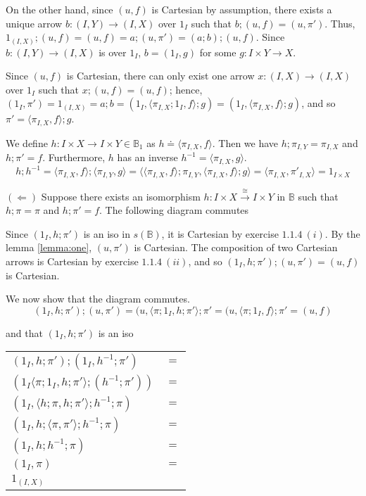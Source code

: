 \documentclass{article}
\begin{document}
On the other hand, since $(u,f)$ is Cartesian by assumption, 
there exists a unique arrow $b : (I,Y) \to (I,X)$ over $1_I$ such that
$b;(u,f) = (u,\pi')$. Thus, $1_{(I,X)};(u,f) = (u,f) = a;(u,\pi') = (a;b);(u,f)$. 
Since $b : (I,Y) \to (I,X)$ is over $1_I$, $b = (1_I, g)$ for some $g : I \times Y \to X$.

Since $(u,f)$ is Cartesian,
there can only exist one arrow $x : (I,X) \to (I,X)$ over $1_I$ such that $x;(u,f) = (u,f)$; hence, 
$(1_I, \pi') = 1_{(I,X)} = a;b = (1_I, \langle \pi_{I,X};1_I , f \rangle; g) = (1_I, \langle \pi_{I,X} , f \rangle; g)$,
and so $\pi' = \langle \pi_{I,X} , f \rangle; g$.

We define $h : I \times X \to I \times Y \in \mathbb B_1$ as $h \doteq \langle \pi_{I,X}, f \rangle$. Then we have $h;\pi_{I,Y} = \pi_{I,X}$ and
$h;\pi' = f$. Furthermore, $h$ has an inverse $h^{-1} = \langle \pi_{I,X}, g \rangle$.
$$ h;h^{-1} = \langle \pi_{I,X}, f \rangle; \langle \pi_{I,Y}, g \rangle = \langle \langle \pi_{I,X}, f \rangle; \pi_{I,Y} 
  , \langle \pi_{I,X}, f \rangle; g \rangle = \langle \pi_{I,X} , \pi'_{I,X} \rangle = 1_{I \times X}$$
 
$(\Leftarrow)$ Suppose there exists an isomorphism $h : I \times X \overset{\cong}{\to} I \times Y$
in $\mathbb B$ such that $h;\pi = \pi$ and $h;\pi' = f$. The following diagram commutes
\begin{center}
\end{center}

Since $(1_I, h;\pi')$ is an iso in $s(\mathbb B)$, it is Cartesian by exercise $1.1.4~(i)$. By the lemma \ref{lemma:one},
$(u,\pi')$ is Cartesian. The composition of two Cartesian arrows is Cartesian by exercise
$1.1.4~(ii)$, and so $(1_I, h;\pi');(u,\pi') = (u,f)$ is Cartesian. 

We now show that the diagram commutes.
$$(1_I, h;\pi');(u,\pi') = (u, \langle \pi;1_I,h;\pi' \rangle;\pi' = (u, \langle \pi;1_I, f \rangle ; \pi' = (u,f) $$

and that $(1_I, h;\pi')$ is an iso
\begin{center}
\begin{tabular}{ll}
$(1_I, h;\pi');(1_I,h^{-1};\pi')$ & $=$ \\ 
$(1_I \langle \pi;1_I, h;\pi' \rangle;(h^{-1};\pi'))$ & $=$ \\
$(1_I, \langle h;\pi, h;\pi' \rangle;h^{-1};\pi)$ & $=$ \\
$(1_I, h;\langle \pi, \pi' \rangle;h^{-1};\pi)$ & $=$ \\
$(1_I, h;h^{-1};\pi)$ & $=$ \\
$(1_I, \pi)$ & $=$ \\
$1_{(I,X)}$ &   
\end{tabular}
\end{center}
 
\end{document}
